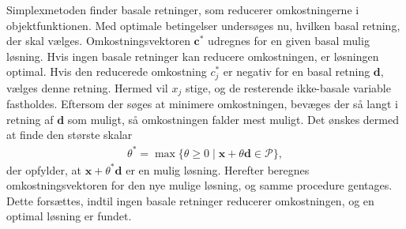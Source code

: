 \noindent
Simplexmetoden finder basale retninger, som reducerer omkostningerne i objektfunktionen. 
Med optimale betingelser undersøges nu, hvilken basal retning, der skal vælges. 
Omkostningsvektoren $\mathbf{c}^*$ udregnes for en given basal mulig løsning. 
Hvis ingen basale retninger kan reducere omkostningen, er løsningen optimal. 
Hvis den reducerede omkostning $c^*_j$ er negativ for en basal retning $\mathbf{d}$, vælges denne retning. 
Hermed vil $x_j$ stige, og de resterende ikke-basale variable fastholdes.
Eftersom der søges at minimere omkostningen, bevæges der så langt i retning af $\textbf{d}$ som muligt, så omkostningen falder mest muligt.
Det ønskes dermed at finde den største skalar
\begin{align*}
\theta^* = \max \{ \theta \geq 0 \mid \textbf{x} + \theta\textbf{d} \in \mathcal{P} \},
\end{align*}
%
der opfylder, at $\mathbf{x} + \theta^* \mathbf{d}$ er en mulig løsning.
Herefter beregnes omkostningsvektoren for den nye mulige løsning, og samme procedure gentages.
Dette forsættes, indtil ingen basale retninger reducerer omkostningen, og en optimal løsning er fundet.
%
%
%
%	
%	
%	
%	
%